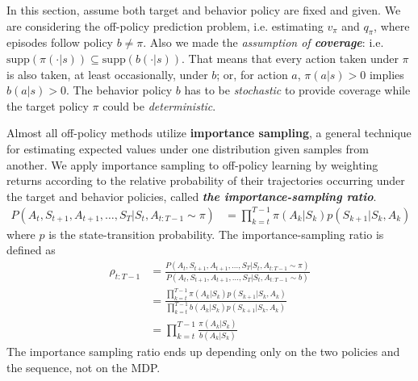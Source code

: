 \documentclass[11pt]{article}
\begin{document}
In this section, assume both target and behavior policy are fixed and given. We are considering the off-policy prediction problem, i.e. estimating $v_{\pi}$ and $q_{\pi}$, where episodes follow policy $b\neq \pi$. Also we made the \emph{assumption of \textbf{coverage}}: i.e. $\text{supp}(\pi(\cdot|s))  \subseteq \text{supp}(b(\cdot|s))$. That means that every action taken under $\pi$ is also taken, at least occasionally, under $b$; or, for action $a$, $\pi(a|s) > 0$ implies $b(a|s) >0$. The behavior policy $b$ has to be \emph{stochastic} to provide coverage while the target policy $\pi$ could be \emph{deterministic}. 



Almost all off-policy methods utilize \textbf{importance sampling}, a general technique for estimating expected values under one distribution given samples from another. We apply importance sampling to off-policy learning by weighting returns according to the relative probability of their trajectories occurring under the target and behavior policies, called \emph{\textbf{the importance-sampling ratio}}.
\begin{align*}
P(A_{t}, S_{t+1}, A_{t+1}, \ldots, S_{T} \big| S_{t}, A_{t:T-1} \sim \pi ) &= \prod_{k=t}^{T-1}\pi(A_{k}|S_{k})p(S_{k+1} | S_{k}, A_{k})
\end{align*} where $p$ is the state-transition probability. The importance-sampling ratio is defined as
\begin{align}
\rho_{t:T-1} &= \frac{P(A_{t}, S_{t+1}, A_{t+1}, \ldots, S_{T} \big| S_{t}, A_{t:T-1} \sim \pi )}{P(A_{t}, S_{t+1}, A_{t+1}, \ldots, S_{T} \big| S_{t}, A_{t:T-1} \sim b )}  \nonumber\\
&= \frac{\prod_{k=t}^{T-1}\pi(A_{k}|S_{k})p(S_{k+1} | S_{k}, A_{k})}{ \prod_{k=t}^{T-1}b(A_{k}|S_{k})p(S_{k+1} | S_{k}, A_{k})} \nonumber\\
&= \prod_{k=t}^{T-1}\frac{\pi(A_{k}|S_{k})}{b(A_{k}|S_{k})} \label{eqn: importance_sample_ratio}
\end{align} The importance sampling ratio ends up depending only on the two policies and the sequence, not on the MDP.
\end{document}

